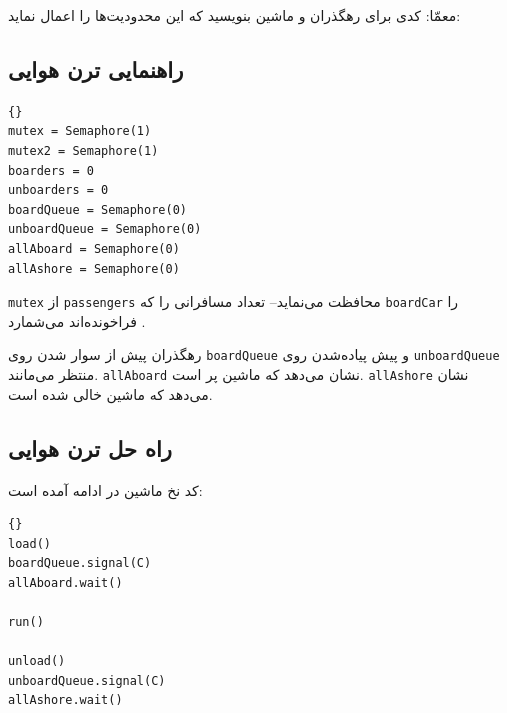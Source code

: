 \documentclass{book}
\newcommand{\clearemptydoublepage}{\newpage\cleardoublepage}
\begin{document}
    معمّا: کدی برای رهگذران و ماشین بنویسید که این محدودیت‌ها را اعمال نماید:


\clearemptydoublepage
\subsection{راهنمایی ترن هوایی}

\begin{latin}
\begin{latin}
\begin{lstlisting}[title=\rl{راهنمایی ترن هوایی}]{}
mutex = Semaphore(1)
mutex2 = Semaphore(1)
boarders = 0
unboarders = 0
boardQueue = Semaphore(0)
unboardQueue = Semaphore(0)
allAboard = Semaphore(0)
allAshore = Semaphore(0)
\end{lstlisting}
\end{latin}
\end{latin}

    {\tt mutex} از {\tt passengers} محافظت می‌نماید--
    تعداد  مسافرانی را که {\tt boardCar} را فراخونده‌اند می‌شمارد . 

    رهگذران پیش از سوار شدن  روی {\tt boardQueue}   و پیش پیاده‌شدن روی {\tt unboardQueue} منتظر می‌مانند.   {\tt allAboard}
    نشان می‌دهد که ماشین پر است. {\tt allAshore} نشان می‌دهد که ماشین خالی شده است. 


\clearemptydoublepage
\subsection{راه حل ترن هوایی}

    کد نخ ماشین در ادامه آمده است: 

\begin{latin}
\begin{latin}
\begin{lstlisting}[title=\rl{راه حل ترن هوایی (ماشین)}]{} 
load()
boardQueue.signal(C)
allAboard.wait()

run()

unload()
unboardQueue.signal(C)
allAshore.wait()
\end{lstlisting}
\end{latin}
\end{latin}
\end{document}
